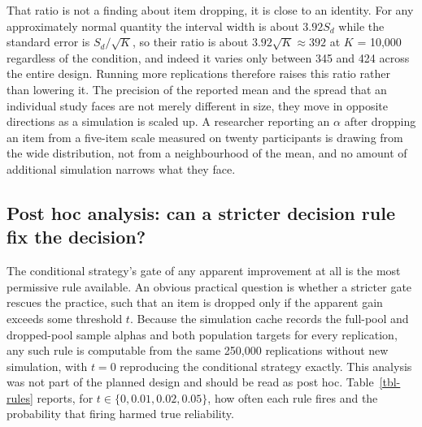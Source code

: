 \documentclass[
  nonatbib,
  authoryear,
  preprint]{elsarticle}
\begin{document}
That ratio is not a finding about item dropping, it is close to an
identity. For any approximately normal quantity the interval width is
about \(3.92 S_d\) while the standard error is \(S_d/\sqrt{K}\), so
their ratio is about \(3.92\sqrt{K} \approx 392\) at \(K\) = 10,000
regardless of the condition, and indeed it varies only between 345 and
424 across the entire design. Running more replications therefore raises
this ratio rather than lowering it. The precision of the reported mean
and the spread that an individual study faces are not merely different
in size, they move in opposite directions as a simulation is scaled up.
A researcher reporting an \(\alpha\) after dropping an item from a
five-item scale measured on twenty participants is drawing from the wide
distribution, not from a neighbourhood of the mean, and no amount of
additional simulation narrows what they face.

\subsection{Post hoc analysis: can a stricter decision rule fix the
decision?}\label{post-hoc-analysis-can-a-stricter-decision-rule-fix-the-decision}

The conditional strategy's gate of any apparent improvement at all is
the most permissive rule available. An obvious practical question is
whether a stricter gate rescues the practice, such that an item is
dropped only if the apparent gain exceeds some threshold \(t\). Because
the simulation cache records the full-pool and dropped-pool sample
alphas and both population targets for every replication, any such rule
is computable from the same 250,000 replications without new simulation,
with \(t = 0\) reproducing the conditional strategy exactly. This
analysis was not part of the planned design and should be read as post
hoc. Table~\ref{tbl-rules} reports, for
\(t \in \{0, 0.01, 0.02, 0.05\}\), how often each rule fires and the
probability that firing harmed true reliability.

\clearpage

\begingroup\fontsize{8}{10}\selectfont
\end{document}
